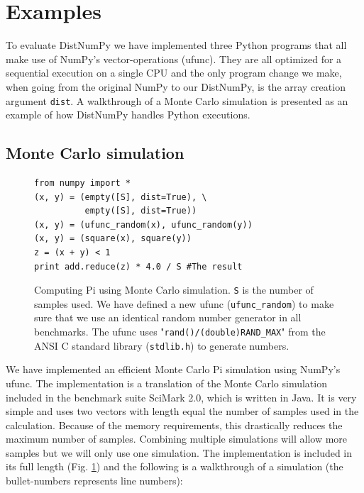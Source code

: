 \documentclass[10pt]{article}
\begin{document}
\section{Examples}
To evaluate DistNumPy we have implemented three Python programs that all make use of NumPy's vector-operations (ufunc). They are all optimized for a sequential execution on a single CPU and the only program change we make, when going from the original NumPy to our DistNumPy, is the array creation argument \texttt{dist}. 
A walkthrough of a Monte Carlo simulation is presented as an example of how DistNumPy handles Python executions.


\subsection{Monte Carlo simulation}
\begin{figure}
\begin{lstlisting}
from numpy import *
(x, y) = (empty([S], dist=True), \
		  empty([S], dist=True))
(x, y) = (ufunc_random(x), ufunc_random(y))
(x, y) = (square(x), square(y))
z = (x + y) < 1
print add.reduce(z) * 4.0 / S #The result
\end{lstlisting}
 \caption{Computing Pi using Monte Carlo simulation. \texttt{S} is the number of samples used. We have defined a new ufunc (\texttt{ufunc\_random}) to make sure that we use an identical random number generator in all benchmarks. The ufunc uses "\texttt{rand()/(double)RAND\_MAX}" from the ANSI C standard library (\texttt{stdlib.h}) to generate numbers.}
 \label{lst:montecarlo}
\end{figure}

We have implemented an efficient Monte Carlo Pi simulation using NumPy's ufunc. The implementation is a translation of the Monte Carlo simulation included in the benchmark suite SciMark 2.0\cite{SciMark}, which is written in Java. It is very simple and uses two vectors with length equal the number of samples used in the calculation. Because of the memory requirements, this drastically reduces the maximum number of samples. Combining multiple simulations will allow more samples but we will only use one simulation. The implementation is included in its full length (Fig. \ref{lst:montecarlo}) and the following is a walkthrough of a simulation (the bullet-numbers represents line numbers):
\end{document}
